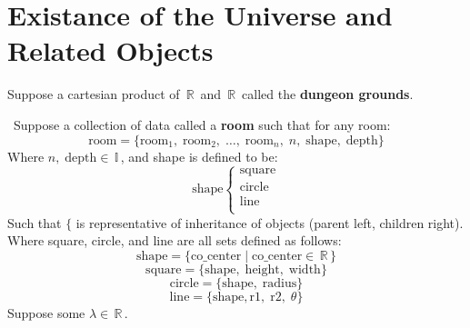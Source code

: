 \documentclass[12pt]{article}
\def\cdate{{Spring 2022}}
\def\II{\,\mathbb{I}\,}
\def\RR{\,\mathbb{R}\,}
\def\small{\,\par \smallskip\,}
\newcommand{\us}[2]{#1_{1}, \; #1_{2}, \; \dots, \; #1_{#2}}
\begin{document}

\section*{Existance of the Universe and Related Objects}
    Suppose a cartesian product of $\RR$ and $\RR$ called the \textbf{dungeon
    grounds}.
    \small
    Suppose a collection of data called a \textbf{room} such that for any room:
    $$\mbox{room} = \{ \us{\mbox{room}}{n}, \; n, \; \mbox{shape}, \; \mbox{depth} \}$$
    Where $n, \; \mbox{depth} \in \II$, and shape is defined to be:
    $$\mbox{shape} \begin{cases} \mbox{square} \\ \mbox{circle} \\ \mbox{line}
    \\ \end{cases}$$
    Such that $\{$ is representative of inheritance of objects (parent left,
    children right).
    Where square, circle, and line are all sets defined as follows:
    $$\mbox{shape} = \{\mbox{co}\_\mbox{center} \; | \; \mbox{co}\_\mbox{center}
    \in \RR \}$$
    $$\mbox{square} = \{\mbox{shape}, \; \mbox{height}, \; \mbox{width}\}$$
    $$\mbox{circle} = \{\mbox{shape}, \; \mbox{radius}\}$$
    $$\mbox{line} = \{\mbox{shape}, \mbox{r1}, \; \mbox{r2}, \; \theta\}$$
    Suppose some $\lambda \in \RR$.
\end{document}
